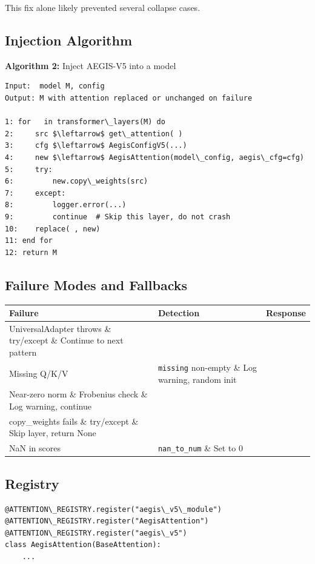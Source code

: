 This fix alone likely prevented several collapse cases.

\subsection{Injection Algorithm}

\textbf{Algorithm 2:} Inject AEGIS-V5 into a model
\begin{lstlisting}
Input:  model M, config
Output: M with attention replaced or unchanged on failure

1: for   in transformer\_layers(M) do
2:     src $\leftarrow$ get\_attention( )
3:     cfg $\leftarrow$ AegisConfigV5(...)
4:     new $\leftarrow$ AegisAttention(model\_config, aegis\_cfg=cfg)
5:     try:
6:         new.copy\_weights(src)
7:     except:
8:         logger.error(...)
9:         continue  # Skip this layer, do not crash
10:    replace( , new)
11: end for
12: return M
\end{lstlisting}

\subsection{Failure Modes and Fallbacks}

\begin{table}[H]
\centering
\small
\begin{tabular}{lll}
\toprule
\textbf{Failure} & \textbf{Detection} & \textbf{Response} \\
\midrule
UniversalAdapter throws \& try/except \& Continue to next pattern \\
Missing Q/K/V & \texttt{missing} non-empty \& Log warning, random init \\
Near-zero norm \& Frobenius check \& Log warning, continue \\
copy\_weights fails \& try/except \& Skip layer, return None \\
NaN in scores & \texttt{nan\_to\_num} \& Set to 0 \\
\bottomrule
\end{tabular}
\end{table}

\subsection{Registry}

\begin{lstlisting}
@ATTENTION\_REGISTRY.register("aegis\_v5\_module")
@ATTENTION\_REGISTRY.register("AegisAttention")
@ATTENTION\_REGISTRY.register("aegis\_v5")
class AegisAttention(BaseAttention):
    ...
\end{lstlisting}

